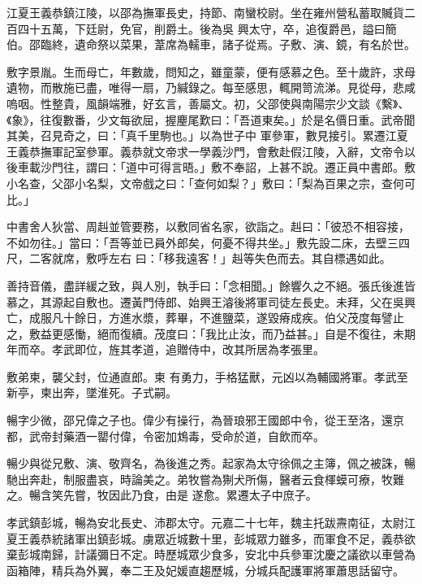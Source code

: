 \begin{pinyinscope}
 江夏王義恭鎮江陵，以邵為撫軍長史，持節、南蠻校尉。坐在雍州營私蓄取贓貨二百四十五萬，下廷尉，免官，削爵土。後為吳
 興太守，卒，追復爵邑，謚曰簡伯。邵臨終，遺命祭以菜果，葦席為轜車，諸子從焉。子敷、演、鏡，有名於世。



 敷字景胤。生而母亡，年數歲，問知之，雖童蒙，便有感慕之色。至十歲許，求母遺物，而散施已盡，唯得一扇，乃緘錄之。每至感思，輒開笥流涕。見從母，悲咸嗚咽。性整貴，風韻端雅，好玄言，善屬文。初，父邵使與南陽宗少文談《繫》、《象》，往復數番，少文每欲屈，握麈尾歎曰：「吾道東矣。」於是名價日重。武帝聞其美，召見奇之，曰：「真千里駒也。」以為世子中
 軍參軍，數見接引。累遷江夏王義恭撫軍記室參軍。義恭就文帝求一學義沙門，會敷赴假江陵，入辭，文帝令以後車載沙門往，謂曰：「道中可得言晤。」敷不奉詔，上甚不說。遷正員中書郎。敷小名查，父邵小名梨，文帝戲之曰：「查何如梨？」敷曰：「梨為百果之宗，查何可比。」



 中書舍人狄當、周赳並管要務，以敷同省名家，欲詣之。赳曰：「彼恐不相容接，不如勿往。」當曰：「吾等並已員外郎矣，何憂不得共坐。」敷先設二床，去壁三四尺，二客就席，敷呼左右
 曰：「移我遠客！」赳等失色而去。其自標遇如此。



 善持音儀，盡詳緩之致，與人別，執手曰：「念相聞。」餘響久之不絕。張氏後進皆慕之，其源起自敷也。遷黃門侍郎、始興王濬後將軍司徒左長史。未拜，父在吳興亡，成服凡十餘日，方進水漿，葬畢，不進鹽菜，遂毀瘠成疾。伯父茂度每譬止之，敷益更感慟，絕而復續。茂度曰：「我比止汝，而乃益甚。」自是不復往，未期年而卒。孝武即位，旌其孝道，追贈侍中，改其所居為孝張里。



 敷弟柬，襲父封，位通直郎。柬
 有勇力，手格猛獸，元凶以為輔國將軍。孝武至新亭，柬出奔，墜淮死。子式嗣。



 暢字少微，邵兄偉之子也。偉少有操行，為晉琅邪王國郎中令，從王至洛，還京都，武帝封藥酒一罌付偉，令密加鴆毒，受命於道，自飲而卒。



 暢少與從兄敷、演、敬齊名，為後進之秀。起家為太守徐佩之主簿，佩之被誅，暢馳出奔赴，制服盡哀，時論美之。弟牧嘗為猘犬所傷，醫者云食楎蟆可療，牧難之。暢含笑先嘗，牧因此乃食，由是
 遂愈。累遷太子中庶子。



 孝武鎮彭城，暢為安北長史、沛郡太守。元嘉二十七年，魏主托跋燾南征，太尉江夏王義恭統諸軍出鎮彭城。虜眾近城數十里，彭城眾力雖多，而軍食不足，義恭欲棄彭城南歸，計議彌日不定。時歷城眾少食多，安北中兵參軍沈慶之議欲以車營為函箱陣，精兵為外翼，奉二王及妃媛直趨歷城，分城兵配護軍將軍蕭思話留守。




\end{pinyinscope}
